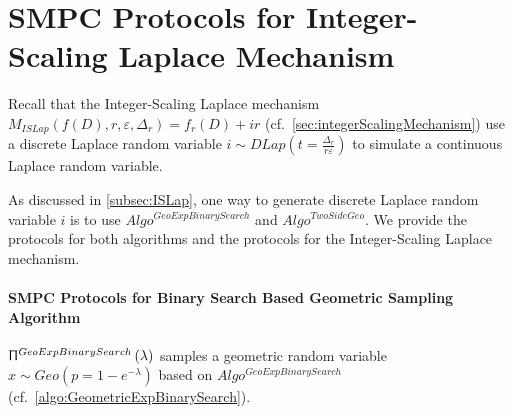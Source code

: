 
                  \section{SMPC Protocols for Integer-Scaling Laplace Mechanism}
                  \label{sec:MPCProtocolsforInteger-ScalingLaplaceMechanism}
                  Recall that the Integer-Scaling Laplace mechanism $M_{ISLap}\left(f\left(D\right),r,\varepsilon,\Delta _r\right)=f_r\left(D\right) +ir$ (cf.~\autoref{sec:integerScalingMechanism}) use a discrete Laplace random variable $i \sim DLap\left(t=\frac{\Delta_r}{r\varepsilon}\right) $ to simulate a continuous Laplace random variable.

                  As discussed in \autoref{subsec:ISLap}, one way to generate discrete Laplace random variable $i$ is to use $Algo^{GeoExpBinarySearch}$ and $Algo^{TwoSideGeo}$.
                  We provide the \smpc protocols for both algorithms and the \smpc protocols for the Integer-Scaling Laplace mechanism.

                  \paragraph{SMPC Protocols for Binary Search Based Geometric Sampling Algorithm}
                  \label{para::MPCProtocolsforBinarySearchBasedGeometricSamplingAlgorithm}
            $\Uppi^{GeoExpBinarySearch}\left(\lambda\right) $ samples a geometric random variable $x\sim Geo\left(p=1-e^{-\lambda}\right) $ based on $Algo^{GeoExpBinarySearch}$ (cf.~\autoref{algo:GeometricExpBinarySearch}).

